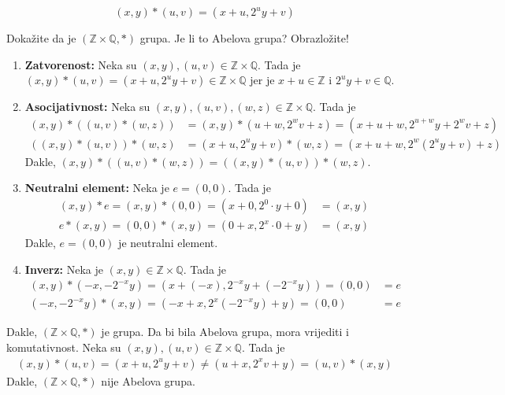 \documentclass{exam}
\begin{document}
\begin{questions}
\[
  (x, y) * (u, v) = (x + u, 2^uy + v)
\]

Dokažite da je $(\mathbb{Z} \times \mathbb{Q}, *)$ grupa. Je li to Abelova grupa? Obrazložite!

\begin{solution}
  \begin{enumerate}
    \item \textbf{Zatvorenost:} Neka su $(x, y), (u, v) \in \mathbb{Z} \times \mathbb{Q}$. Tada je $(x, y) * (u, v) = (x + u, 2^uy + v) \in \mathbb{Z} \times \mathbb{Q}$ jer je $x + u \in \mathbb{Z}$ i $2^uy + v \in \mathbb{Q}$.

    \item \textbf{Asocijativnost:} Neka su $(x, y), (u, v), (w, z) \in \mathbb{Z} \times \mathbb{Q}$. Tada je
      \begin{align*}
        (x, y) * ((u, v) * (w, z)) &= (x, y) * (u + w, 2^w v + z) = (x + u + w,2^{u + w}y + 2^w v + z) \\
        ((x, y) * (u, v)) * (w, z) &= (x + u, 2^uy + v) * (w, z) = (x + u + w, 2^{w}(2^uy + v) + z)
      \end{align*}
      Dakle, $(x, y) * ((u, v) * (w, z)) = ((x, y) * (u, v)) * (w, z)$.

    \item \textbf{Neutralni element:} Neka je $e = (0, 0)$. Tada je
      \begin{align*}
        (x, y) * e = (x, y) * (0, 0) = (x + 0, 2^0 \cdot y + 0) &= (x, y)\\
        e * (x, y) = (0, 0) * (x, y) = (0 + x, 2^x \cdot 0 + y) &= (x, y)
      \end{align*}
      Dakle, $e = (0, 0)$ je neutralni element.

    \item \textbf{Inverz:} Neka je $(x, y) \in \mathbb{Z} \times \mathbb{Q}$. Tada je
      \begin{align*}
        (x, y) * (-x, -2^{-x}y) = (x + (-x), 2^{-x}y + (-2^{-x}y)) = (0, 0) &= e \\
        (-x, -2^{-x}y) * (x, y) = (-x + x, 2^x(-2^{-x}y) + y) = (0, 0) &= e
      \end{align*}
  \end{enumerate}
  Dakle, $(\mathbb{Z} \times \mathbb{Q}, *)$ je grupa. Da bi bila Abelova grupa, mora vrijediti i komutativnost. Neka su $(x, y), (u, v) \in \mathbb{Z} \times \mathbb{Q}$. Tada je
  \begin{align*}
    (x, y) * (u, v) = (x + u, 2^uy + v) \neq (u + x, 2^xv + y) = (u, v) * (x, y)
  \end{align*}
  Dakle, $(\mathbb{Z} \times \mathbb{Q}, *)$ nije Abelova grupa.
\end{solution}


\end{questions}
\end{document}
